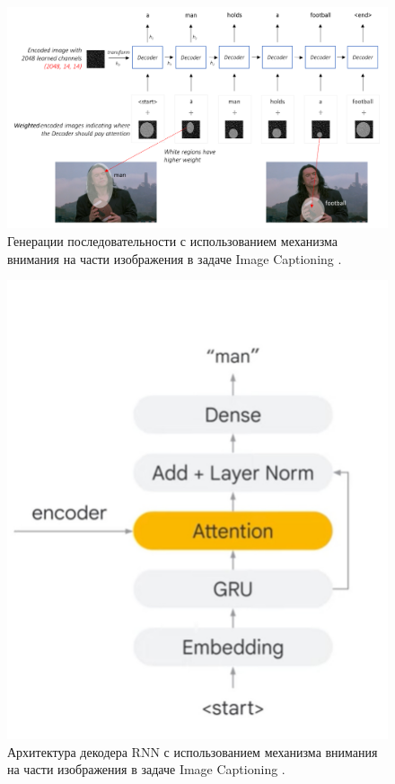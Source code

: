 \documentclass[a4paper,12pt]{extarticle}
\begin{document}
\begin{figure}[ht]
	\centering
	\includegraphics[scale=0.5]{decoder_att.png}
	\caption{Генерации последовательности с использованием механизма внимания на части изображения в задаче Image Captioning \cite{cnn-rnn-image-captioning}.}
	\label{fig:image-caption-decoder-att}
\end{figure}

\begin{figure}[ht]
	\centering
	\includegraphics[scale=0.3]{image-captioning-decoder.png}
	\caption{Архитектура декодера RNN с использованием механизма внимания на части изображения в задаче Image Captioning \cite{cnn-rnn-image-captioning-google}.}
	\label{fig:image-caption-decoder-rnn}
\end{figure}
\end{document}
